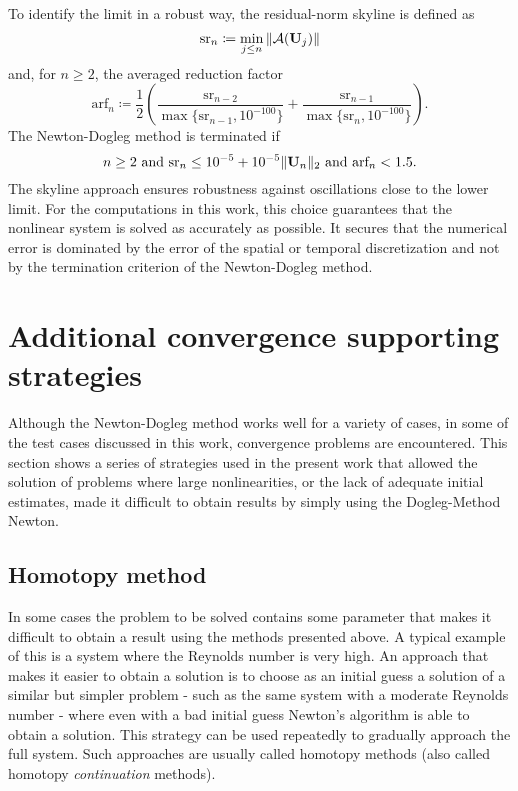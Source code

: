 To identify the limit in a robust way, the residual-norm skyline is defined as
\begin{equation}
	\textrm{sr}_n \coloneqq \min_{j \leq n} \| \mathcal{A}(\textbf{U}_j) \|
\end{equation}
and, for $n \geq 2$, the averaged reduction factor
\begin{equation}
	\textrm{arf}_n \coloneqq \frac{1}{2} \left(
	\frac{ \textrm{sr}_{n-2} }{  \max \{ \textrm{sr}_{n-1}, 10^{-100} \} }
	+  \frac{ \textrm{sr}_{n-1} }{  \max \{ \textrm{sr}_{n},   10^{-100} \} }
	\right) .
\end{equation}
The Newton-Dogleg method is terminated if
\begin{equation}
	n \geq 2 \text{ and }
	\textrm{sr}_n \leq 10^{-5} + 10^{-5} \| \textbf{U}_n \|_2 \text{ and }
	\textrm{arf}_n < 1.5 .
\end{equation}
The skyline approach ensures robustness against oscillations close to the lower limit. For the computations in this work, this choice guarantees that the nonlinear system is solved as accurately as possible. It secures that the numerical error is dominated by the error of the spatial or temporal discretization and not by the termination criterion of the Newton-Dogleg method. 


\section{Additional convergence supporting strategies}\label{sec:ConvSupportStrat}
Although the Newton-Dogleg method works well for a variety of cases, in some of the test cases discussed in this work, convergence problems are encountered. This section shows a series of strategies used in the present work that allowed the solution of problems where large nonlinearities, or the lack of adequate initial estimates, made it difficult to obtain results by simply using the Dogleg-Method Newton. 

\subsection{Homotopy method} \label{sec:HomotopyMethod}

In some cases the problem to be solved contains some parameter that makes it difficult to obtain a result using the methods presented above. A typical example of this is a system where the Reynolds number is very high. An approach that makes it easier to obtain a solution is to choose as an initial guess a solution of a similar but simpler problem - such as the same system with a moderate Reynolds number - where even with a bad initial guess Newton's algorithm is able to obtain a solution. This strategy can be used repeatedly to gradually approach the full system. Such approaches are usually called homotopy methods (also called homotopy \textit{continuation} methods). 


